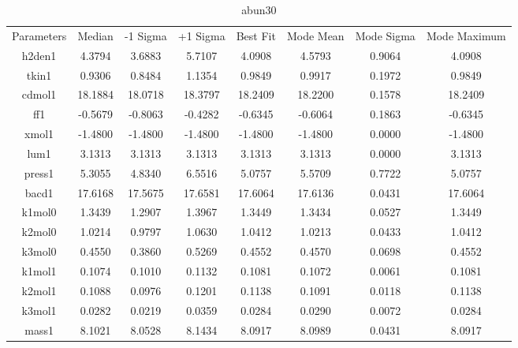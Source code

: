 \begin{table}
\caption{abun30}
\begin{tabular}{cccccccc}
Parameters & Median & -1 Sigma & +1 Sigma & Best Fit & Mode Mean & Mode Sigma & Mode Maximum \\
h2den1 & 4.3794 & 3.6883 & 5.7107 & 4.0908 & 4.5793 & 0.9064 & 4.0908 \\
tkin1 & 0.9306 & 0.8484 & 1.1354 & 0.9849 & 0.9917 & 0.1972 & 0.9849 \\
cdmol1 & 18.1884 & 18.0718 & 18.3797 & 18.2409 & 18.2200 & 0.1578 & 18.2409 \\
ff1 & -0.5679 & -0.8063 & -0.4282 & -0.6345 & -0.6064 & 0.1863 & -0.6345 \\
xmol1 & -1.4800 & -1.4800 & -1.4800 & -1.4800 & -1.4800 & 0.0000 & -1.4800 \\
lum1 & 3.1313 & 3.1313 & 3.1313 & 3.1313 & 3.1313 & 0.0000 & 3.1313 \\
press1 & 5.3055 & 4.8340 & 6.5516 & 5.0757 & 5.5709 & 0.7722 & 5.0757 \\
bacd1 & 17.6168 & 17.5675 & 17.6581 & 17.6064 & 17.6136 & 0.0431 & 17.6064 \\
k1mol0 & 1.3439 & 1.2907 & 1.3967 & 1.3449 & 1.3434 & 0.0527 & 1.3449 \\
k2mol0 & 1.0214 & 0.9797 & 1.0630 & 1.0412 & 1.0213 & 0.0433 & 1.0412 \\
k3mol0 & 0.4550 & 0.3860 & 0.5269 & 0.4552 & 0.4570 & 0.0698 & 0.4552 \\
k1mol1 & 0.1074 & 0.1010 & 0.1132 & 0.1081 & 0.1072 & 0.0061 & 0.1081 \\
k2mol1 & 0.1088 & 0.0976 & 0.1201 & 0.1138 & 0.1091 & 0.0118 & 0.1138 \\
k3mol1 & 0.0282 & 0.0219 & 0.0359 & 0.0284 & 0.0290 & 0.0072 & 0.0284 \\
mass1 & 8.1021 & 8.0528 & 8.1434 & 8.0917 & 8.0989 & 0.0431 & 8.0917 \\
\end{tabular}
\end{table}
